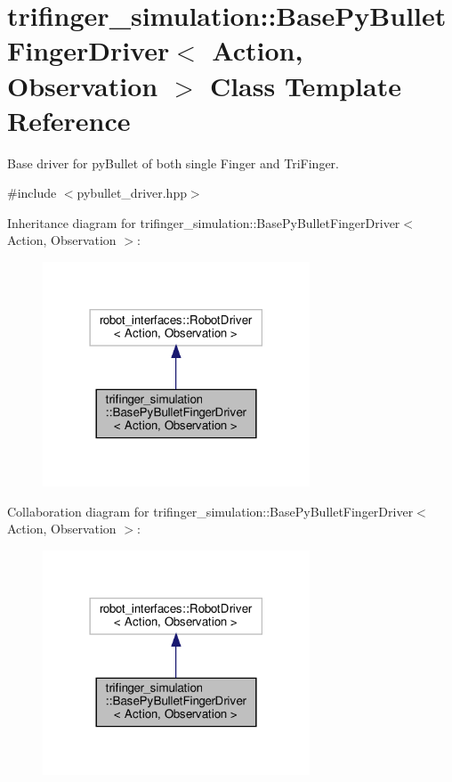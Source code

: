 \hypertarget{classtrifinger__simulation_1_1BasePyBulletFingerDriver}{}\section{trifinger\+\_\+simulation\+:\+:Base\+Py\+Bullet\+Finger\+Driver$<$ Action, Observation $>$ Class Template Reference}
\label{classtrifinger__simulation_1_1BasePyBulletFingerDriver}


Base driver for py\+Bullet of both single Finger and Tri\+Finger.  




{\ttfamily \#include $<$pybullet\+\_\+driver.\+hpp$>$}



Inheritance diagram for trifinger\+\_\+simulation\+:\+:Base\+Py\+Bullet\+Finger\+Driver$<$ Action, Observation $>$\+:
\nopagebreak
\begin{figure}[H]
\begin{center}
\leavevmode
\includegraphics[width=225pt]{classtrifinger__simulation_1_1BasePyBulletFingerDriver__inherit__graph}
\end{center}
\end{figure}


Collaboration diagram for trifinger\+\_\+simulation\+:\+:Base\+Py\+Bullet\+Finger\+Driver$<$ Action, Observation $>$\+:
\nopagebreak
\begin{figure}[H]
\begin{center}
\leavevmode
\includegraphics[width=225pt]{classtrifinger__simulation_1_1BasePyBulletFingerDriver__coll__graph}
\end{center}
\end{figure}
